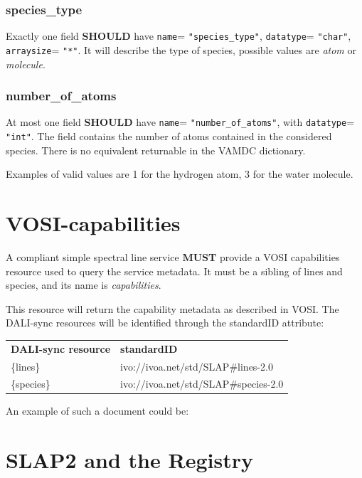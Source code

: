 \documentclass[11pt,a4paper]{ivoa}
\def\attrval#1#2{\texttt{#1}\discretionary{}{}{}=\discretionary{}{}{}%
  \texttt{"#2"}}
\begin{document}
\subsubsection{species\_type}

Exactly one field \textbf{SHOULD} have
\attrval{name}{species\_type}, \attrval{datatype}{char},
\attrval{arraysize}{*}. It will describe the type of species, possible values are
\textit{atom} or \textit{molecule}.

\subsubsection{number\_of\_atoms}
At most one field \textbf{SHOULD} have \attrval{name}{number\_of\_atoms}, with  \attrval{datatype}{int}.
The field contains the number of atoms contained in the considered species.
There is no equivalent returnable in the VAMDC dictionary.

Examples of valid values are 1 for the hydrogen atom, 3 for the water molecule.


\section{VOSI-capabilities}
\label{sect:vosicap}

A compliant simple spectral line service \textbf{MUST} provide a
VOSI capabilities resource used to query the service metadata.  
It must be a sibling of lines and species, and its name is \textit{capabilities}.

This resource will return the capability metadata as described in
VOSI. The DALI-sync resources will
be identified through the standardID attribute:

\begin{inlinetable}
\begin{tabular}{p{4.8780003cm}p{8.736cm}}
\sptablerule
\textbf{DALI-sync resource} &
\textbf{standardID}\\
\sptablerule
\{lines\} &
{ivo://ivoa.net/std/SLAP\#lines-2.0} \\
\{species\} &
{ivo://ivoa.net/std/SLAP\#species-2.0}\\

\end{tabular}
\end{inlinetable}

An example of such a document could be:


\section{SLAP2 and the Registry}
\label{sect:reg}
\end{document}
